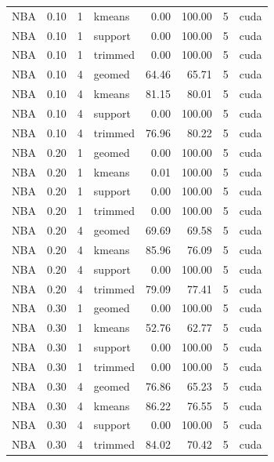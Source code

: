 \begin{tabular}{lrrlrrrl}
NBA & 0.10 & 1 & kmeans & 0.00 & 100.00 & 5 & cuda \\
NBA & 0.10 & 1 & support & 0.00 & 100.00 & 5 & cuda \\
NBA & 0.10 & 1 & trimmed & 0.00 & 100.00 & 5 & cuda \\
NBA & 0.10 & 4 & geomed & 64.46 & 65.71 & 5 & cuda \\
NBA & 0.10 & 4 & kmeans & 81.15 & 80.01 & 5 & cuda \\
NBA & 0.10 & 4 & support & 0.00 & 100.00 & 5 & cuda \\
NBA & 0.10 & 4 & trimmed & 76.96 & 80.22 & 5 & cuda \\
NBA & 0.20 & 1 & geomed & 0.00 & 100.00 & 5 & cuda \\
NBA & 0.20 & 1 & kmeans & 0.01 & 100.00 & 5 & cuda \\
NBA & 0.20 & 1 & support & 0.00 & 100.00 & 5 & cuda \\
NBA & 0.20 & 1 & trimmed & 0.00 & 100.00 & 5 & cuda \\
NBA & 0.20 & 4 & geomed & 69.69 & 69.58 & 5 & cuda \\
NBA & 0.20 & 4 & kmeans & 85.96 & 76.09 & 5 & cuda \\
NBA & 0.20 & 4 & support & 0.00 & 100.00 & 5 & cuda \\
NBA & 0.20 & 4 & trimmed & 79.09 & 77.41 & 5 & cuda \\
NBA & 0.30 & 1 & geomed & 0.00 & 100.00 & 5 & cuda \\
NBA & 0.30 & 1 & kmeans & 52.76 & 62.77 & 5 & cuda \\
NBA & 0.30 & 1 & support & 0.00 & 100.00 & 5 & cuda \\
NBA & 0.30 & 1 & trimmed & 0.00 & 100.00 & 5 & cuda \\
NBA & 0.30 & 4 & geomed & 76.86 & 65.23 & 5 & cuda \\
NBA & 0.30 & 4 & kmeans & 86.22 & 76.55 & 5 & cuda \\
NBA & 0.30 & 4 & support & 0.00 & 100.00 & 5 & cuda \\
NBA & 0.30 & 4 & trimmed & 84.02 & 70.42 & 5 & cuda \\
\bottomrule
\end{tabular}

